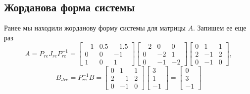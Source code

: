 \documentclass[a4paper, 12pt]{article}
\begin{document}
    \subsection{Жорданова форма системы}
    Ранее мы находили жорданову форму системы для матрицы $A$. Запишем ее еще раз
    $$
    A=P_{re}J_{re}P_{re}^{-1}=\begin{bmatrix}
        -1 &0.5 &-1.5\\
        0 &0 &-1\\
        1 &0 &1
    \end{bmatrix}\begin{bmatrix}
        -2 &0 &0\\
        0 &-2 &1\\
        0 &-1 &-2
    \end{bmatrix}\begin{bmatrix}
        0 &1 &1\\
        2 &-1 &2\\
        0 &-1 &0
    \end{bmatrix},
    $$
    $$
    B_{Jre}=P_{re}^{-1}B=\begin{bmatrix}
        0 &1 &1\\
        2 &-1 &2\\
        0 &-1 &0
    \end{bmatrix}\begin{bmatrix}
        3\\
        1\\
        -1
    \end{bmatrix}=\begin{bmatrix}
        0\\
        3\\
        -1
    \end{bmatrix}
    $$
\end{document}

